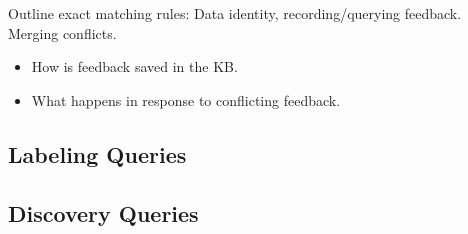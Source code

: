 
Outline exact matching rules: Data identity, recording/querying feedback.  Merging conflicts.

\begin{itemize}
  \item How is feedback saved in the KB.
  \item What happens in response to conflicting feedback.  
\end{itemize}



\subsection{Labeling Queries}

\subsection{Discovery Queries}
